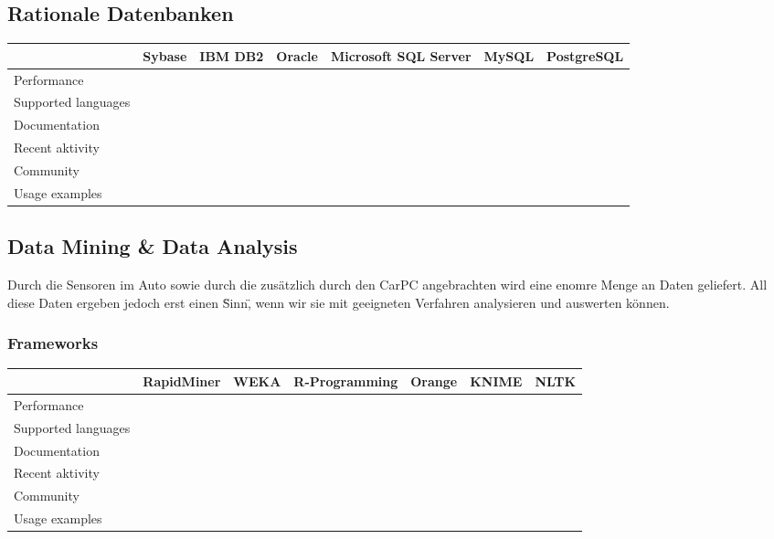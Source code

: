 	\subsection{Rationale Datenbanken}
		
		\begin{tabular} {| l | c | c | c | c | c | c |}
			\hline
			& Sybase & IBM DB2 & Oracle & Microsoft SQL Server & MySQL & PostgreSQL	\\ \hline \hline
			Performance &  &	 &  &  &  &  &		\\ \hline
			Supported languages &  &	 &  &  &  &  &	 			\\ \hline
			Documentation &  &	 &  &  &  &  &	 		\\ \hline
			Recent aktivity &  &	 &  &  &  &  &			\\ \hline
			Community &  &  &  &  &  &  &		\\ \hline 
			Usage examples	&  &	&  &  &  &  &					\\ \hline
		\end{tabular}

	\newpage
	\subsection{Data Mining \& Data Analysis}
	Durch die Sensoren im Auto sowie durch die zusätzlich durch den CarPC angebrachten wird eine enomre Menge an Daten geliefert. All diese Daten ergeben jedoch erst einen \"Sinn\", wenn wir sie mit geeigneten Verfahren analysieren und auswerten können. 

		\subsubsection{Frameworks}

		\begin{tabular} {| l | c | c | c | c | c | c |}
			\hline
			& RapidMiner & WEKA &  R-Programming & Orange & KNIME & NLTK		\\ \hline \hline
			Performance &  &	 &  &  &  &  &		\\ \hline
			Supported languages &  &	 &  &  &  &  &	 			\\ \hline
			Documentation &  &	 &  &  &  &  &	 		\\ \hline
			Recent aktivity &  &	 &  &  &  &  &			\\ \hline
			Community &  &  &  &  &  &  &		\\ \hline 
			Usage examples	&  &	&  &  &  &  &					\\ \hline
		\end{tabular}

